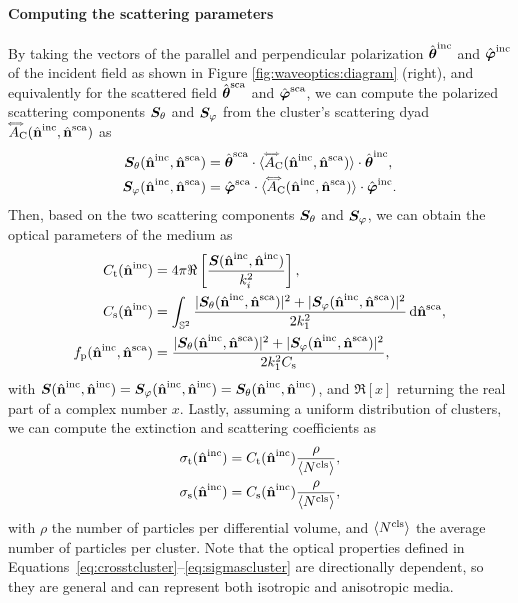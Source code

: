 \paragraph{Computing the scattering parameters}
By taking the vectors of the parallel and perpendicular polarization ${\hat{\bm\theta}}^\mathrm{inc}$ and ${\hat{\bm\varphi}}^\mathrm{inc}$ of the incident field as shown in Figure \ref{fig:waveoptics:diagram} (right), and equivalently for the scattered field ${\hat{\bm\theta}}^\mathrm{sca}$ and ${\hat{\bm\varphi}}^\mathrm{sca}$, we can compute the polarized scattering components $\bm{S}_\theta$ and $\bm{S}_\varphi$ from the cluster's scattering dyad ${\accentset{\Longleftrightarrow}{A}}_{\mathrm{C}}({\hat{\mathbf{n}}}^\mathrm{inc},{\hat{\mathbf{n}}}^\mathrm{sca})$ as
\begin{align}
  \bm{S}_\theta({\hat{\mathbf{n}}}^\mathrm{inc},{\hat{\mathbf{n}}}^\mathrm{sca}) &= {\hat{\bm\theta}}^\mathrm{sca} \cdot {\langle {\accentset{\Longleftrightarrow}{A}}_{\mathrm{C}}({\hat{\mathbf{n}}}^\mathrm{inc},{\hat{\mathbf{n}}}^\mathrm{sca}) \rangle} \cdot {\hat{\bm\theta}}^\mathrm{inc}, \nonumber \\
  \bm{S}_\varphi({\hat{\mathbf{n}}}^\mathrm{inc},{\hat{\mathbf{n}}}^\mathrm{sca}) &= {\hat{\bm\varphi}}^\mathrm{sca} \cdot {\langle {\accentset{\Longleftrightarrow}{A}}_{\mathrm{C}}({\hat{\mathbf{n}}}^\mathrm{inc},{\hat{\mathbf{n}}}^\mathrm{sca}) \rangle} \cdot {\hat{\bm\varphi}}^\mathrm{inc}.
\end{align}
Then, based on the two scattering components $\bm{S}_\theta$ and $\bm{S}_\varphi$, we can obtain the optical parameters of the medium as
\begin{align}
    \label{eq:crosstcluster}
    \Ct(\hatbfni) &= 4\pi \Re\left[\frac{\bmS(\hatbfni,\hatbfni)}{k_i^2}\right], \\
    \label{eq:crossscluster}
    \Cs(\hatbfni) &=\int_{\bbSS} \frac{|\bmStheta(\hatbfnis)|^2+|\bmSphi(\hatbfnis)|^2}{2k_1^2} \intd \hatbfns, \\
    \label{eq:phasecluster}
    \fp(\hatbfnis) &= \frac{|\bmStheta(\hatbfnis)|^2+|\bmSphi(\hatbfnis)|^2}{2k_1^2\Cs},
\end{align}
with $\bm{S}({\hat{\mathbf{n}}}^\mathrm{inc},{\hat{\mathbf{n}}}^\mathrm{inc})=\bm{S}_\varphi({\hat{\mathbf{n}}}^\mathrm{inc},{\hat{\mathbf{n}}}^\mathrm{inc})=\bm{S}_\theta({\hat{\mathbf{n}}}^\mathrm{inc},{\hat{\mathbf{n}}}^\mathrm{inc})$, and $\Re[x]$ returning the real part of a complex number $x$. Lastly, assuming a uniform distribution of clusters, we can compute the extinction and scattering coefficients as
\begin{align}
    \label{eq:sigmatcluster}
    \sigmat(\hatbfni) &= \Ct(\hatbfni) \frac{\rho}{\EV{\Ncls}}, \\
    \label{eq:sigmascluster}
    \sigmas(\hatbfni) &= \Cs(\hatbfni) \frac{\rho}{\EV{\Ncls}},
\end{align}
with $\rho$ the number of particles per differential volume, and ${\langle N^\mathrm{cls} \rangle}$ the average number of particles per cluster. Note that the optical properties defined in Equations~\eqref{eq:crosstcluster}--\eqref{eq:sigmascluster} are directionally dependent, so they are general and can represent both isotropic and anisotropic media. 


